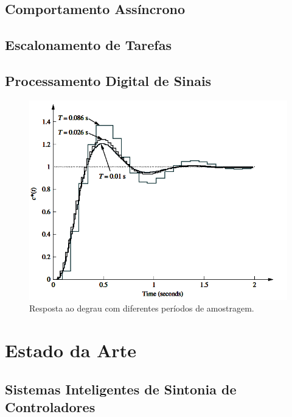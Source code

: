 \subsection{Comportamento Assíncrono}

\subsection{Escalonamento de Tarefas}

\subsection{Processamento Digital de Sinais}

\begin{figure}[!ht]
  \caption{Resposta ao degrau com diferentes períodos de amostragem.}
  \begin{center}
      \includegraphics[scale=0.65]{img/nise_digitalinput_p761}
  \end{center}
  \label{fig:nise_digitalinput_p761}
\end{figure}

\section{Estado da Arte}

\subsection{Sistemas Inteligentes de Sintonia de Controladores}


